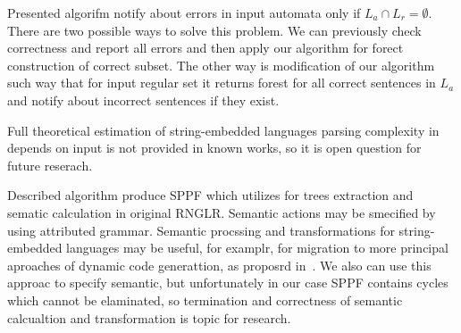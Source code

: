 Presented algorifm notify about errors in input automata only if $L_a \cap L_r = \emptyset$. There are two possible ways to solve this problem.
We can previously check correctness and report all errors and then apply our algorithm for forect construction of correct subset.
The other way is modification of our algorithm such way that for input regular set it returns forest for all correct sentences in $L_a$ 
and notify about incorrect sentences if they exist.

Full theoretical estimation of string-embedded languages parsing complexity in depends on input is not provided 
in known works, so it is open question for future reserach.

Described algorithm produce SPPF which utilizes for trees extraction and sematic calculation in original RNGLR. Semantic actions may be smecified by using attributed grammar.
Semantic procssing and transformations for string-embedded languages may be useful, for examplr, for migration to more principal aproaches of dynamic code generattion, as proposrd in~\cite{EvalToStaged}.
We also can use this approac to specify semantic, but unfortunately in our case SPPF contains cycles which cannot be elaminated, so termination 
and correctness of semantic calcualtion and transformation is topic for research. 

